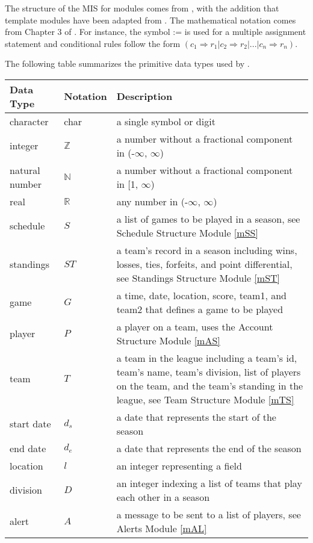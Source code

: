 \documentclass[12pt, titlepage]{article}
\begin{document}
The structure of the MIS for modules comes from \citet{HoffmanAndStrooper1995},
with the addition that template modules have been adapted from
\cite{GhezziEtAl2003}.  The mathematical notation comes from Chapter 3 of
\citet{HoffmanAndStrooper1995}.  For instance, the symbol := is used for a
multiple assignment statement and conditional rules follow the form $(c_1
\Rightarrow r_1 | c_2 \Rightarrow r_2 | ... | c_n \Rightarrow r_n )$.

The following table summarizes the primitive data types used by \progname. 

\begin{center}
\renewcommand{\arraystretch}{1.2}
\noindent 
\begin{tabular}{l l p{7.5cm}} 
\toprule 
\textbf{Data Type} & \textbf{Notation} & \textbf{Description}\\ 
\midrule
character & char & a single symbol or digit\\
integer & $\mathbb{Z}$ & a number without a fractional component in (-$\infty$, $\infty$) \\
natural number & $\mathbb{N}$ & a number without a fractional component in [1, $\infty$) \\
real & $\mathbb{R}$ & any number in (-$\infty$, $\infty$)\\
schedule & $S$ & a list of games to be played in a season, see Schedule
Structure Module \ref{mSS}\\
standings & $ST$ & a team's record in a season including wins, losses,
ties, forfeits, and point differential, see Standings
Structure Module \ref{mST}\\
game & $G$ & a time, date, location, score, team1, and team2 that defines a game to
be played\\
player & $P$ & a player on a team, uses the Account Structure Module
\ref{mAS}\\
team & $T$ & a team in the league including a team's id, team's name, team's division,
list of players on the team, and the team's standing in the league,
see Team Structure Module \ref{mTS}\\
start date & $d_s$ & a date that represents the start of the season\\
end date & $d_e$ & a date that represents the end of the season\\
location & $l$ & an integer representing a field\\
division & $D$ & an integer indexing a list of teams that play each other in a
season\\
alert & $A$ & a message to be sent to a list of players, see Alerts Module
\ref{mAL}\\

\bottomrule
\end{tabular} 
\end{center}
\end{document}
